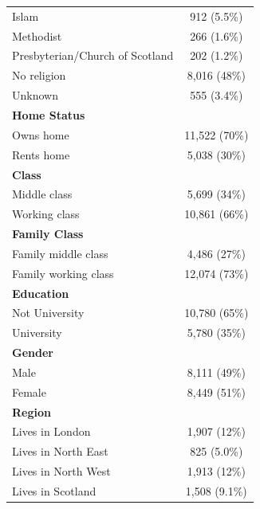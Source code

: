 \documentclass[]{cupjournal}
\begin{document}
\begin{longtable}[t]{lc}
\hspace{1em}Islam & 912 (5.5\%)\\
\hspace{1em}Methodist & 266 (1.6\%)\\
\hspace{1em}Presbyterian/Church of Scotland & 202 (1.2\%)\\
\hspace{1em}No religion & 8,016 (48\%)\\
\hspace{1em}Unknown & 555 (3.4\%)\\
\textbf{Home Status} & \\
\hspace{1em}Owns home & 11,522 (70\%)\\
\hspace{1em}Rents home & 5,038 (30\%)\\
\textbf{Class} & \\
\hspace{1em}Middle class & 5,699 (34\%)\\
\hspace{1em}Working class & 10,861 (66\%)\\
\textbf{Family Class} & \\
\hspace{1em}Family middle class & 4,486 (27\%)\\
\hspace{1em}Family working class & 12,074 (73\%)\\
\textbf{Education} & \\
\hspace{1em}Not University & 10,780 (65\%)\\
\hspace{1em}University & 5,780 (35\%)\\
\textbf{Gender} & \\
\hspace{1em}Male & 8,111 (49\%)\\
\hspace{1em}Female & 8,449 (51\%)\\
\textbf{Region} & \\
\hspace{1em}Lives in London & 1,907 (12\%)\\
\hspace{1em}Lives in North East & 825 (5.0\%)\\
\hspace{1em}Lives in North West & 1,913 (12\%)\\
\hspace{1em}Lives in Scotland & 1,508 (9.1\%)\\

\end{longtable}
\end{document}
